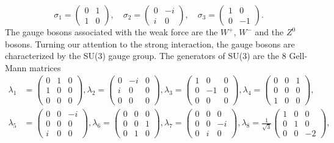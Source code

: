 \begin{equation}
	\sigma_1 =
	\begin{pmatrix}
	0&1\\
	1&0
	\end{pmatrix}, \quad
	\sigma_2 = 
	\begin{pmatrix}
	0&-i\\
	i&0
	\end{pmatrix}, \quad
	\sigma_3 = 
	\begin{pmatrix}
	1&0\\
	0&-1
	\end{pmatrix}.
\end{equation}
The gauge bosons associated with the weak force are the $W^+$, $W^-$ and the $Z^0$ bosons. Turning our attention to the strong interaction, the gauge bosons are characterized by the SU(3) gauge group. The generators of SU(3) are the 8 Gell-Mann matrices
\begin{align} \label{eq:gellmannmatrices}
	\lambda_1 &= \begin{pmatrix} 0 & 1 & 0 \\ 1 & 0 & 0 \\ 0 & 0 & 0 \end{pmatrix},
	\lambda_2 = \begin{pmatrix} 0 & -i & 0 \\ i & 0 & 0 \\ 0 & 0 & 0 \end{pmatrix},
	\lambda_3 = \begin{pmatrix} 1 & 0 & 0 \\ 0 & -1 & 0 \\ 0 & 0 & 0 \end{pmatrix},
	\lambda_4 = \begin{pmatrix} 0 & 0 & 1 \\ 0 & 0 & 0 \\ 1 & 0 & 0 \end{pmatrix}, \nonumber \\
	\lambda_5 &= \begin{pmatrix} 0 & 0 & -i \\ 0 & 0 & 0 \\ i & 0 & 0 \end{pmatrix},
	\lambda_6 = \begin{pmatrix} 0 & 0 & 0 \\ 0 & 0 & 1 \\ 0 & 1 & 0 \end{pmatrix},
	\lambda_7 = \begin{pmatrix} 0 & 0 & 0 \\ 0 & 0 & -i \\ 0 & i & 0 \end{pmatrix},
	\lambda_8 = \frac{1}{\sqrt{3}} \begin{pmatrix} 1 & 0 & 0 \\ 0 & 1 & 0 \\ 0 & 0 & -2 \end{pmatrix},
\end{align}

